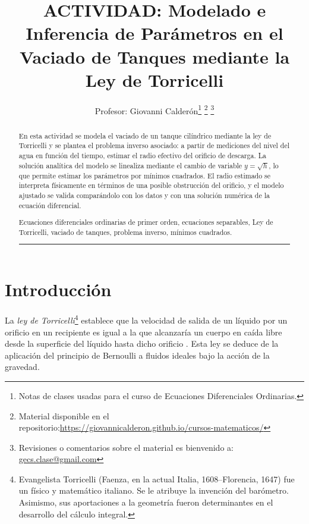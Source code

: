 \documentclass[oneside,letter,spanish,activeacute,english,links,10pt]{amcaGCS_EDO}
\title{ACTIVIDAD: Modelado e Inferencia de Parámetros en el Vaciado de Tanques mediante la Ley de Torricelli}
\author[a]{Profesor: Giovanni Calderón\thanks{Notas de clases usadas para el curso de Ecuaciones Diferenciales Ordinarias.} 
	\thanks{Material disponible en el repositorio:\url{https://giovannicalderon.github.io/cursos-matematicos/}}
	\thanks{Revisiones o comentarios sobre el material es bienvenido a: \url{gecs.clase@gmail.com}}}
\begin{document}
\maketitle
\noindent\hrulefill
\renewcommand{\abstractname}{Resumen}

\begin{abstract}
En esta actividad se modela el vaciado de un tanque cilíndrico mediante la ley de Torricelli y se plantea el problema inverso asociado: a partir de mediciones del nivel del agua en función del tiempo, estimar el radio efectivo del orificio de descarga. La solución analítica del modelo se linealiza mediante el cambio de variable $y=\sqrt{h}$, lo que permite estimar los parámetros por mínimos cuadrados. El radio estimado se interpreta físicamente en términos de una posible obstrucción del orificio, y el modelo ajustado se valida comparándolo con los datos y con una solución numérica de la ecuación diferencial.
	
	
	\bigskip{}
	Ecuaciones diferenciales ordinarias de primer orden, ecuaciones separables, Ley de Torricelli, vaciado de tanques, problema inverso, mínimos cuadrados.
	\\\noindent\rule[2mm]{16cm}{1pt}
	
	
\end{abstract}

\vspace{.6cm}


\ifdefined\decimalpoint\decimalpoint\fi


\section{Introducción}
La {\it ley de Torricelli}\footnote{Evangelista Torricelli (Faenza, en la actual Italia, 1608--Florencia, 1647) fue un físico y matemático italiano. Se le atribuye la invención del barómetro. Asimismo, sus aportaciones a la geometría fueron determinantes en el desarrollo del cálculo integral.} establece que la velocidad de salida de un líquido por un orificio en un recipiente es igual a la que alcanzaría un cuerpo en caída libre desde la superficie del líquido hasta dicho orificio \cite{Boyce, Zill1, Zill2, FoxMcDonald2015}. Esta ley se deduce de la aplicación del principio de Bernoulli a fluidos ideales bajo la acción de la gravedad.
\end{document}
